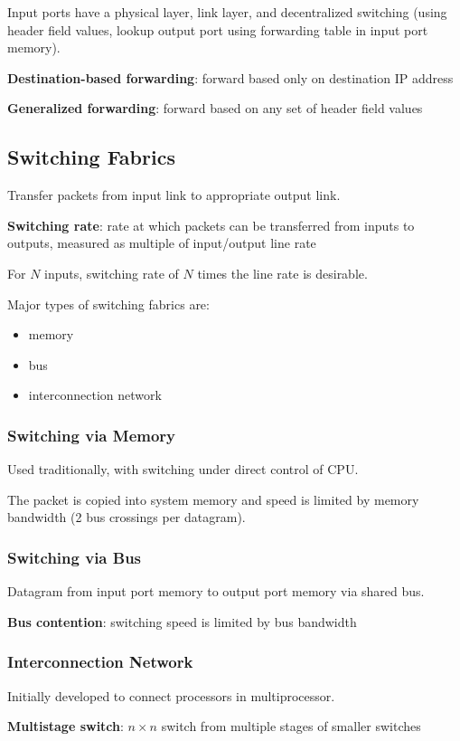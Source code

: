 \documentclass[11pt]{article}
\begin{document}
Input ports have a physical layer, link layer, and decentralized switching (using header
field values, lookup output port using forwarding table in input port memory).

\textbf{Destination-based forwarding}: forward based only on destination IP address

\textbf{Generalized forwarding}: forward based on any set of header field values
\subsection{Switching Fabrics}
\label{sec:org6f54a56}
Transfer packets from input link to appropriate output link.

\textbf{Switching rate}: rate at which packets can be transferred from inputs to outputs,
measured as multiple of input/output line rate

For \(N\) inputs, switching rate of \(N\) times the line rate is desirable.

Major types of switching fabrics are:
\begin{itemize}
\item memory
\item bus
\item interconnection network
\end{itemize}
\subsubsection{Switching via Memory}
\label{sec:org2970b17}
Used traditionally, with switching under direct control of CPU.

The packet is copied into system memory and speed is limited by memory bandwidth
(2 bus crossings per datagram).
\subsubsection{Switching via Bus}
\label{sec:org8600e63}
Datagram from input port memory to output port memory via shared bus.

\textbf{Bus contention}: switching speed is limited by bus bandwidth
\subsubsection{Interconnection Network}
\label{sec:org45e7c1b}
Initially developed to connect processors in multiprocessor.

\textbf{Multistage switch}: \(n \times n\) switch from multiple stages of smaller switches
\end{document}
